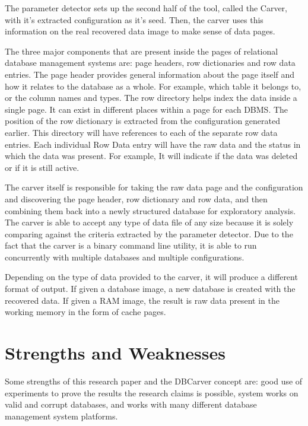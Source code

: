 \documentclass[11pt,]{article}
\begin{document}
The parameter detector sets up the second half of the tool, called the
Carver, with it's extracted configuration as it's seed. Then, the carver
uses this information on the real recovered data image to make sense of
data pages.

The three major components that are present inside the pages of
relational database management systems are: page headers, row
dictionaries and row data entries. The page header provides general
information about the page itself and how it relates to the database as
a whole. For example, which table it belongs to, or the column names and
types. The row directory helps index the data inside a single page. It
can exist in different places within a page for each DBMS. The position
of the row dictionary is extracted from the configuration generated
earlier. This directory will have references to each of the separate row
data entries. Each individual Row Data entry will have the raw data and
the status in which the data was present. For example, It will indicate
if the data was deleted or if it is still active.

The carver itself is responsible for taking the raw data page and the
configuration and discovering the page header, row dictionary and row
data, and then combining them back into a newly structured database for
exploratory analysis. The carver is able to accept any type of data file
of any size because it is solely comparing against the criteria
extracted by the parameter detector. Due to the fact that the carver is
a binary command line utility, it is able to run concurrently with
multiple databases and multiple configurations.

Depending on the type of data provided to the carver, it will produce a
different format of output. If given a database image, a new database is
created with the recovered data. If given a RAM image, the result is raw
data present in the working memory in the form of cache pages.

\hypertarget{strengths-and-weaknesses}{%
\section{Strengths and Weaknesses}\label{strengths-and-weaknesses}}

Some strengths of this research paper and the DBCarver concept are: good
use of experiments to prove the results the research claims is possible,
system works on valid and corrupt databases, and works with many
different database management system platforms.
\end{document}
